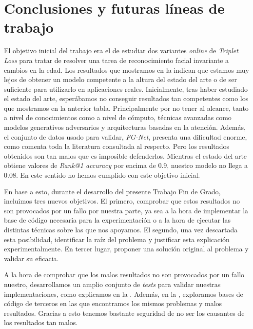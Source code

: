 \chapter{Conclusiones y futuras líneas de trabajo} \label{ich:conclusiones}

El objetivo inicial del trabajo era el de estudiar dos variantes \textit{online} de \textit{Triplet Loss} para tratar de resolver una tarea de reconocimiento facial invariante a cambios en la edad. Los resultados que mostramos en la  indican que estamos muy lejos de obtener un modelo competente a la altura del estado del arte o de ser suficiente para utilizarlo en aplicaciones reales. Inicialmente, tras haber estudiado el estado del arte, esperábamos no conseguir resultados tan competentes como los que mostramos en la anterior tabla. Principalmente por no tener al alcance, tanto a nivel de conocimientos como a nivel de cómputo, técnicas avanzadas como modelos generativos adversarios y arquitecturas basadas en la atención. Además, el conjunto de datos usado para validar, \textit{FG-Net}, presenta una dificultad enorme, como comenta toda la literatura consultada al respecto. Pero los resultados obtenidos son tan malos que es imposible defenderlos. Mientras el estado del arte obtiene valores de \textit{Rank@1 accuracy} por encima de 0.9, nuestro modelo no llega a 0.08. En este sentido no hemos cumplido con este objetivo inicial.

En base a esto, durante el desarrollo del presente Trabajo Fin de Grado, incluimos tres nuevos objetivos. El primero, comprobar que estos resultados no son provocados por un fallo por nuestra parte, ya sea a la hora de implementar la base de código necesaria para la experimentación o a la hora de ejecutar las distintas técnicas sobre las que nos apoyamos. El segundo, una vez descartada esta posibilidad, identificar la raíz del problema y justificar esta explicación experimentalmente. En tercer lugar, proponer una solución original al problema y validar su eficacia.

A la hora de comprobar que los malos resultados no son provocados por un fallo nuestro, desarrollamos un amplio conjunto de \textit{tests} para validar nuestras implementaciones, como explicamos en la . Además, en la , exploramos bases de código de terceros en las que encontramos los mismos problemas y malos resultados. Gracias a esto tenemos bastante seguridad de no ser los causantes de los resultados tan malos.

